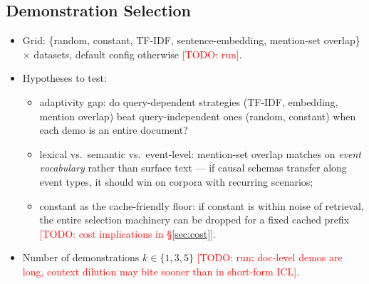 \documentclass[11pt]{article}
\newcommand{\todo}[1]{\textcolor{red}{[TODO: #1]}}
\begin{document}
\subsection{Demonstration Selection}
\label{sec:ablations-selection}
\begin{itemize}
  \item Grid: \{random, constant, TF-IDF, sentence-embedding, mention-set
        overlap\} $\times$ datasets, default config otherwise \todo{run}.
  \item Hypotheses to test:
        \begin{itemize}
          \item adaptivity gap: do query-dependent strategies (TF-IDF,
                embedding, mention overlap) beat query-independent ones
                (random, constant) when each demo is an entire document?
          \item lexical vs.\ semantic vs.\ event-level: mention-set overlap
                matches on \emph{event vocabulary} rather than surface text ---
                if causal schemas transfer along event types, it should win on
                corpora with recurring scenarios;
          \item constant as the cache-friendly floor: if constant is within
                noise of retrieval, the entire selection machinery can be
                dropped for a fixed cached prefix \todo{cost implications in
                \S\ref{sec:cost}}.
        \end{itemize}
  \item Number of demonstrations $k \in \{1, 3, 5\}$ \todo{run; doc-level
        demos are long, context dilution may bite sooner than in
        short-form ICL}.
\end{itemize}
\end{document}
